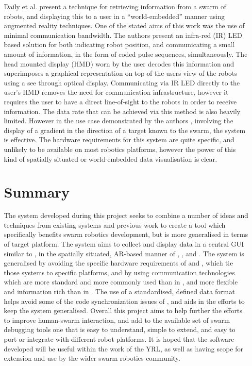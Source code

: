 Daily et al. \cite{Daily:2003} present a technique for retrieving information from a swarm of robots, and displaying this to a user in a ``world-embedded'' manner using augmented reality techniques. One of the stated aims of this work was the use of minimal communication bandwidth. The authors present \cite{Daily:2003} an infra-red (IR) LED based solution for both indicating robot position, and communicating a small amount of information, in the form of coded pulse sequences, simultaneously. The head mounted display (HMD) worn by the user decodes this information and superimposes a graphical representation on top of the users view of the robots using a see through optical display. Communicating via IR LED directly to the user's HMD removes the need for communication infrastructure, however it requires the user to have a direct line-of-sight to the robots in order to receive information. The data rate that can be achieved via this method is also heavily limited. However in the use case demonstrated by the authors \cite{Daily:2003}, involving the display of a gradient in the direction of a target known to the swarm, the system is effective. The hardware requirements for this system are quite specific, and unlikely to be available on most robotics platforms, however the power of this kind of spatially situated or world-embedded data visualisation is clear.

\section{Summary}
The system developed during this project seeks to combine a number of ideas and techniques from existing systems and previous work to create a tool which specifically benefits swarm robotics development, but is more generalised in terms of target platform. The system aims to collect and display data in a central GUI similar to \cite{McLurkin:2006}, in the spatially situated, AR-based manner of \cite{Collet:2006}, \cite{Ghiringhelli:2014}, and \cite{Daily:2002}. The system is generalised by avoiding the specific hardware requirements of \cite{Collet:2006} and \cite{McLurkin}, which tie those systems to specific platforms, and by using communication technologies which are more standard and more commonly used than in \cite{Daily:2002}, and more flexible and information rich than in \cite{Podevijn:2012}. The use of a standardised, defined data format helps avoid some of the code synchronization issues of \cite{McLurkin:2006}, and aids in the efforts to keep the system generalised. Overall this project aims to help further the efforts to improve human-swarm interaction, and add to the available set of swarm debugging tools one that is easy to understand, simple to extend, and easy to port or integrate with different robot platforms. It is hoped that the software developed will be useful within the work of the YRL, as well as having scope for extension and use by the wider swarm robotics community.
